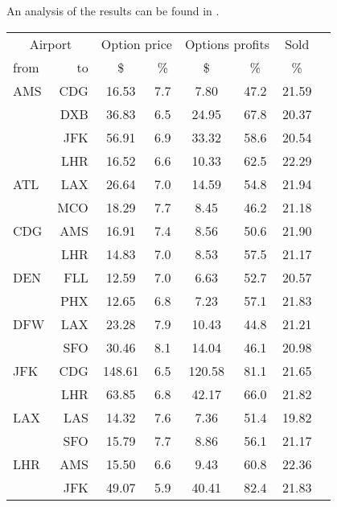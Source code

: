 An analysis of the results can be found in .
\\[2em]
\begin{table}[h]
    \begin{center}
        \begin{tabular}{l r c c c c c c}
            \toprule
            \multicolumn{2}{c}{Airport}  & \multicolumn{2}{c}{Option price} & \multicolumn{2}{c}{Options profits}  &  Sold  \\[.4ex]
            from  &  to  &  \$  & \%  &  \$  & \%  & \%  \\
            \midrule
AMS  &  CDG &   16.53  &     7.7  &    7.80  &    47.2  &   21.59  \\
     &  DXB &   36.83  &     6.5  &   24.95  &    67.8  &   20.37  \\
     &  JFK &   56.91  &     6.9  &   33.32  &    58.6  &   20.54  \\
     &  LHR &   16.52  &     6.6  &   10.33  &    62.5  &   22.29  \\[.5ex]
ATL  &  LAX &   26.64  &     7.0  &   14.59  &    54.8  &   21.94  \\
     &  MCO &   18.29  &     7.7  &    8.45  &    46.2  &   21.18  \\[.5ex]
CDG  &  AMS &   16.91  &     7.4  &    8.56  &    50.6  &   21.90  \\
     &  LHR &   14.83  &     7.0  &    8.53  &    57.5  &   21.17  \\[.5ex]
DEN  &  FLL &   12.59  &     7.0  &    6.63  &    52.7  &   20.57  \\
     &  PHX &   12.65  &     6.8  &    7.23  &    57.1  &   21.83  \\[.5ex]
DFW  &  LAX &   23.28  &     7.9  &   10.43  &    44.8  &   21.21  \\
     &  SFO &   30.46  &     8.1  &   14.04  &    46.1  &   20.98  \\[.5ex]
JFK  &  CDG &  148.61  &     6.5  &  120.58  &    81.1  &   21.65  \\
     &  LHR &   63.85  &     6.8  &   42.17  &    66.0  &   21.82  \\[.5ex]
LAX  &  LAS &   14.32  &     7.6  &    7.36  &    51.4  &   19.82  \\
     &  SFO &   15.79  &     7.7  &    8.86  &    56.1  &   21.17  \\[.5ex]
LHR  &  AMS &   15.50  &     6.6  &    9.43  &    60.8  &   22.36  \\
     &  JFK &   49.07  &     5.9  &   40.41  &    82.4  &   21.83  \\

\end{tabular}
\end{center}
\end{table}

